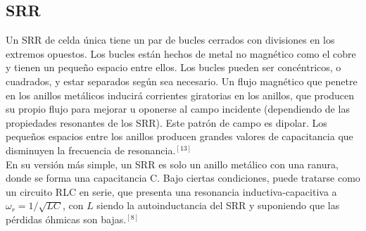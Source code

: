 \documentclass[11pt,letterpaper,twocolumn]{article}
\begin{document}
\subsection*{SRR}
Un SRR de celda única tiene un par de bucles cerrados con divisiones en los extremos opuestos. Los bucles están hechos de metal no magnético como el cobre y tienen un pequeño espacio entre ellos. Los bucles pueden ser concéntricos, o cuadrados, y estar separados según sea necesario. Un flujo magnético que penetre en los anillos metálicos inducirá corrientes giratorias en los anillos, que producen su propio flujo para mejorar u oponerse al campo incidente (dependiendo de las propiedades resonantes de los SRR). Este patrón de campo es dipolar. Los pequeños espacios entre los anillos producen grandes valores de capacitancia que disminuyen la frecuencia de resonancia.$^{[13]}$ \\

En su versión más simple, un SRR es solo un anillo metálico con una ranura, donde se forma una capacitancia C. Bajo ciertas condiciones, puede tratarse como un circuito RLC en serie, que presenta una resonancia inductiva-capacitiva a $\omega_{r}=1/\sqrt{LC}$, con $L$ siendo la autoinductancia del SRR y suponiendo que las pérdidas óhmicas son bajas.$^{[8]}$
\end{document}
